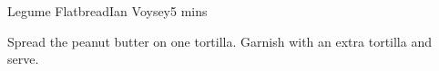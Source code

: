 \begin{recipe}{Legume Flatbread}{Ian Voysey}{5 mins}

  Spread the peanut butter on one tortilla. Garnish with an extra tortilla
  and serve.
\end{recipe}
